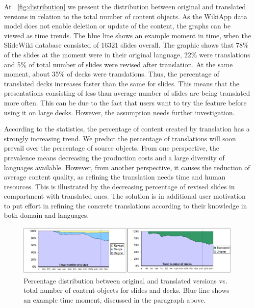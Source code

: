 \documentclass[ngerman,UKenglish,table]{scrbook}
\begin{document}
At ~\autoref{fig:distribution} we present the distribution between original and translated versions in relation to the total number of content objects.
As the WikiApp data model does not enable deletion or update of the content, the graphs can be viewed as time trends. 
The blue line shows an example moment in time, when the SlideWiki database consisted of 16321 slides overall. 
The graphic shows that 78\% of the slides at the moment were in their original language,  22\% were translations and 5\% of total number of slides were revised after translation.
At the same moment, about 35\% of decks were translations.
Thus, the percentage of translated decks increases faster than the same for slides.
This means that the presentations consisting of less than average number of slides are being translated more often.
This can be due to the fact that users want to try the feature before using it on large decks.
However, the assumption needs further investigation.

According to the statistics, the percentage of content created by translation has a strongly increasing trend.
We predict the percentage of translations will soon prevail over the percentage of source objects. 
From one perspective, the prevalence means decreasing the production costs and a large diversity of languages available.
However, from another perspective, it causes the reduction of average content quality, as refining the translation needs time and human resources.
This is illustrated by the decreasing percentage of revised slides in compartment with translated ones. 
The solution is in additional user motivation to put effort in refining the concrete translations according to their knowledge in both domain and languages. 

\begin{figure}[!ht]
\centering
\includegraphics[width=1\textwidth]{Images/translations_number.png}
\caption{Percentage distribution between original and translated versions vs. total number of content objects for slides and decks. Blue line shows an example time moment, discussed in the paragraph above.}
\label{fig:distribution}
\end{figure}
\end{document}
